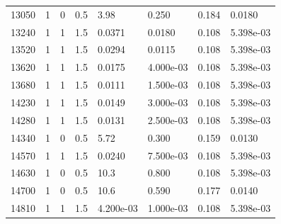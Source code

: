 \documentclass[preview]{standalone}
\begin{document}
{{{{{{\begin{tabular}{L{1.2cm}C{1.2cm} C{0.3cm}C{0.5cm} C{1.4cm}C{1.4cm} C{1.4cm}C{1.4cm}}
  13050  &     1  & 0     & 0.5 &  3.98  & 0.250  & 0.184 &  0.0180   \\ 
  13240  &     1  & 1     & 1.5 &  0.0371  & 0.0180  & 0.108 &  5.398e-03   \\ 
  13520  &     1  & 1     & 1.5 &  0.0294  & 0.0115  & 0.108 &  5.398e-03   \\ 
  13620  &     1  & 1     & 1.5 &  0.0175  & 4.000e-03  & 0.108 &  5.398e-03   \\ 
  13680  &     1  & 1     & 1.5 &  0.0111  & 1.500e-03  & 0.108 &  5.398e-03   \\ 
  14230  &     1  & 1     & 1.5 &  0.0149  & 3.000e-03  & 0.108 &  5.398e-03   \\ 
  14280  &     1  & 1     & 1.5 &  0.0131  & 2.500e-03  & 0.108 &  5.398e-03   \\ 
  14340  &     1  & 0     & 0.5 &  5.72  & 0.300  & 0.159 &  0.0130   \\ 
  14570  &     1  & 1     & 1.5 &  0.0240  & 7.500e-03  & 0.108 &  5.398e-03   \\ 
  14630  &     1  & 0     & 0.5 &  10.3  & 0.800  & 0.108 &  5.398e-03   \\ 
  14700  &     1  & 0     & 0.5 &  10.6  & 0.590  & 0.177 &  0.0140   \\ 
  14810  &     1  & 1     & 1.5 &  4.200e-03  & 1.000e-03  & 0.108 &  5.398e-03   \\ 
\hline 
\end{tabular} 

}}}}}}
\end{document}
